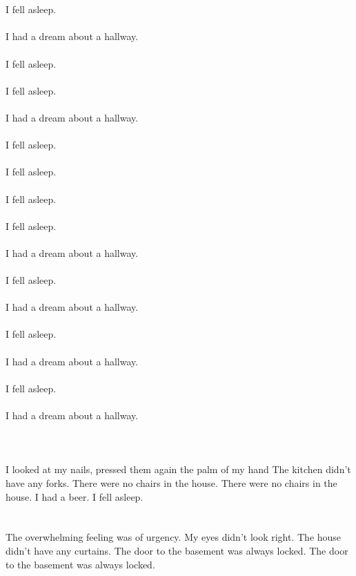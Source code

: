 \documentclass{article}
\begin{document}
    \section{}
    I fell asleep.\\\\I had a dream about a hallway.\\\\ I fell asleep.\\\\ I fell asleep.\\\\I had a dream about a hallway.\\\\ I fell asleep.\\\\ I fell asleep.\\\\ I fell asleep.\\\\ I fell asleep.\\\\I had a dream about a hallway.\\\\ I fell asleep.\\\\I had a dream about a hallway.\\\\ I fell asleep.\\\\I had a dream about a hallway.\\\\ I fell asleep.\\\\I had a dream about a hallway.\\\\ 
    \newpage
    
    \section{}
    I looked at my nails, pressed them again the palm of my hand The kitchen didn't have any forks. There were no chairs in the house. There were no chairs in the house. I had a beer. I fell asleep.  
    \newpage
    
    \section{}
    The overwhelming feeling was of urgency. My eyes didn't look right. The house didn't have any curtains. The door to the basement was always locked. The door to the basement was always locked.  
    \newpage
    
\end{document}
